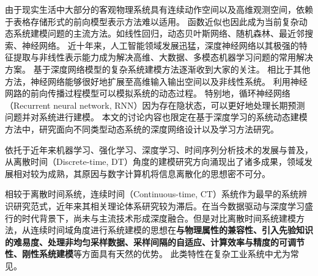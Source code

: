 由于现实生活中大部分的客观物理系统具有连续动作空间以及高维观测空间，依赖于表格存储形式的前向模型表示方法难以适用。
函数近似也因此成为当前复杂动态系统建模问题的主流方法。如线性回归\cite{silver2008sample}，动态贝叶斯网络、随机森林、最近邻搜索、神经网络\cite{werbos1989neural}。
近十年来，人工智能领域发展迅猛，深度神经网络以其极强的特征提取与非线性表示能力成为解决高维、大数据、多模态机器学习问题的常用解决方案。
基于深度网络模型的复杂系统建模方法逐渐收到大家的关注。
相比于其他方法，神经网络能够很好地扩展至高维输入输出空间以及非线性系统。
利用神经网路的前向传播过程模型可以模拟系统的动态过程\cite{temeng1995model, tan1996nonlinear}。
特别地，循环神经网络（Recurrent neural network, RNN）因为存在隐状态，可以更好地处理长期预测问题并对系统进行建模\cite{delgado1995dynamic, zamarreno1998state}。
本文的讨论内容也限定在基于深度学习的系统动态建模方法中，研究面向不同类型动态系统的深度网络设计以及学习方法研究。


依托于近年来机器学习、强化学习\cite{sutton2018reinforcement}、深度学习\cite{lecun2015deep}\cite{duan2016}、时间序列分析技术\cite{shumway2000time}的发展与普及，
从离散时间（Discrete-time, DT）角度的建模研究方向涌现出了诸多成果，领域发展相对较为成熟，其原因与数字计算机将信息离散化的思想密不可分。

相较于离散时间系统，连续时间（Continuous-time, CT）系统作为最早的系统辨识研究范式，近年来其相关理论体系研究较为滞后。在当今数据驱动与深度学习盛行的时代背景下，尚未与主流技术形成深度融合。但是对比离散时间系统建模方法，从连续时间域角度进行系统建模的思想在\textbf{与物理属性的兼容性、引入先验知识的难易度、处理非均匀采样数据、采样间隔的自适应、计算效率与精度的可调节性、刚性系统建模}等方面具有天然的优势。
此类特性在复杂工业系统中尤为常见。


